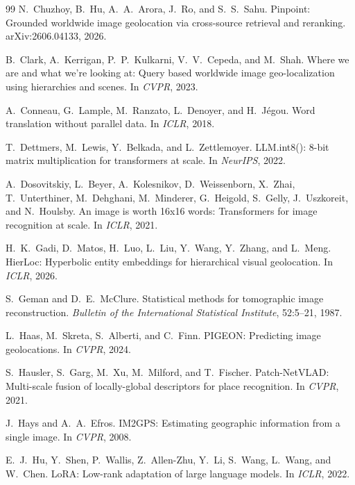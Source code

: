 \documentclass[11pt,a4paper]{article}
\begin{document}
\begin{thebibliography}{99}
N.~Chuzhoy, B.~Hu, A.~A.~Arora, J.~Ro, and S.~S.~Sahu.
\newblock Pinpoint: Grounded worldwide image geolocation via cross-source retrieval and
reranking.
\newblock arXiv:2606.04133, 2026.

B.~Clark, A.~Kerrigan, P.~P.~Kulkarni, V.~V.~Cepeda, and M.~Shah.
\newblock Where we are and what we're looking at: Query based worldwide image geo-localization
using hierarchies and scenes.
\newblock In \emph{CVPR}, 2023.

A.~Conneau, G.~Lample, M.~Ranzato, L.~Denoyer, and H.~J\'egou.
\newblock Word translation without parallel data.
\newblock In \emph{ICLR}, 2018.

T.~Dettmers, M.~Lewis, Y.~Belkada, and L.~Zettlemoyer.
\newblock LLM.int8(): 8-bit matrix multiplication for transformers at scale.
\newblock In \emph{NeurIPS}, 2022.

A.~Dosovitskiy, L.~Beyer, A.~Kolesnikov, D.~Weissenborn, X.~Zhai, T.~Unterthiner,
M.~Dehghani, M.~Minderer, G.~Heigold, S.~Gelly, J.~Uszkoreit, and N.~Houlsby.
\newblock An image is worth 16x16 words: Transformers for image recognition at scale.
\newblock In \emph{ICLR}, 2021.

H.~K.~Gadi, D.~Matos, H.~Luo, L.~Liu, Y.~Wang, Y.~Zhang, and L.~Meng.
\newblock HierLoc: Hyperbolic entity embeddings for hierarchical visual geolocation.
\newblock In \emph{ICLR}, 2026.

S.~Geman and D.~E.~McClure.
\newblock Statistical methods for tomographic image reconstruction.
\newblock \emph{Bulletin of the International Statistical Institute}, 52:5--21, 1987.

L.~Haas, M.~Skreta, S.~Alberti, and C.~Finn.
\newblock PIGEON: Predicting image geolocations.
\newblock In \emph{CVPR}, 2024.

S.~Hausler, S.~Garg, M.~Xu, M.~Milford, and T.~Fischer.
\newblock Patch-NetVLAD: Multi-scale fusion of locally-global descriptors for place
recognition.
\newblock In \emph{CVPR}, 2021.

J.~Hays and A.~A.~Efros.
\newblock IM2GPS: Estimating geographic information from a single image.
\newblock In \emph{CVPR}, 2008.

E.~J.~Hu, Y.~Shen, P.~Wallis, Z.~Allen-Zhu, Y.~Li, S.~Wang, L.~Wang, and W.~Chen.
\newblock LoRA: Low-rank adaptation of large language models.
\newblock In \emph{ICLR}, 2022.


\end{thebibliography}
\end{document}

